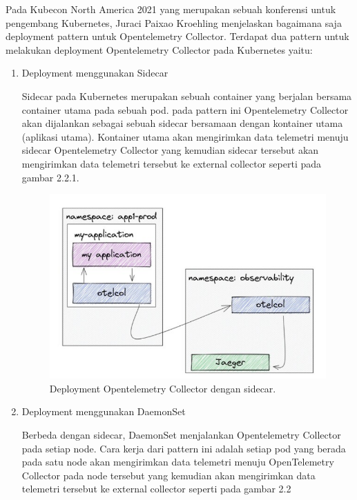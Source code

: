   Pada Kubecon North America 2021 yang merupakan sebuah konferensi untuk pengembang Kubernetes, Juraci Paixao Kroehling menjelaskan bagaimana saja deployment pattern untuk Opentelemetry Collector. Terdapat dua pattern untuk melakukan deployment Opentelemetry Collector pada Kubernetes yaitu: 
  \begin{enumerate}
    \item Deployment menggunakan Sidecar
    
    Sidecar pada Kubernetes merupakan sebuah container yang berjalan bersama container utama pada sebuah pod. pada pattern ini Opentelemetry Collector akan dijalankan sebagai sebuah sidecar bersamaan dengan kontainer utama (aplikasi utama). Kontainer utama akan mengirimkan data telemetri menuju sidecar Opentelemetry Collector yang kemudian sidecar tersebut akan mengirimkan data telemetri tersebut ke external collector seperti pada gambar 2.2.1.

    \begin{figure}[H]
      \centering
        \includegraphics[scale=0.8]{gambar/sidecar-pattern}
        \caption{Deployment Opentelemetry Collector dengan sidecar.}
        \label{otel-collector-sidecar}
    \end{figure}
    
  \item Deployment menggunakan DaemonSet
  
  Berbeda dengan sidecar, DaemonSet menjalankan Opentelemetry Collector pada setiap node. Cara kerja dari pattern ini adalah setiap pod yang berada pada satu node akan mengirimkan data telemetri menuju OpenTelemetry Collector pada node tersebut yang kemudian akan mengirimkan data telemetri tersebut ke external collector seperti pada gambar 2.2


\end{enumerate}
